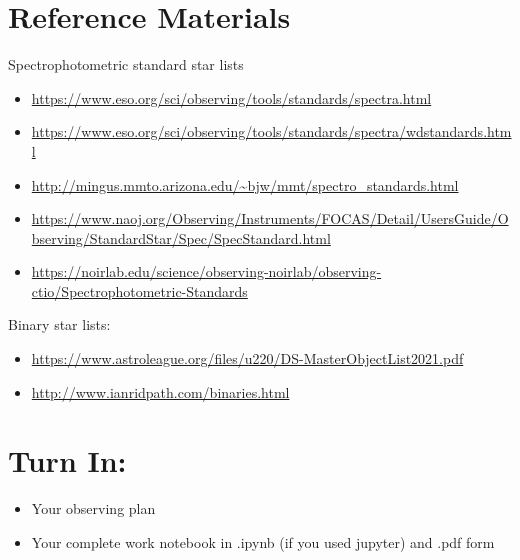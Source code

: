 \documentclass[11pt]{article}
\begin{document}
 

\section{Reference Materials}
Spectrophotometric standard star lists

\begin{itemize}
    \item \url{https://www.eso.org/sci/observing/tools/standards/spectra.html}
    \item \url{https://www.eso.org/sci/observing/tools/standards/spectra/wdstandards.html}
    \item \url{http://mingus.mmto.arizona.edu/~bjw/mmt/spectro_standards.html}
    \item \url{https://www.naoj.org/Observing/Instruments/FOCAS/Detail/UsersGuide/Observing/StandardStar/Spec/SpecStandard.html}
    \item \url{https://noirlab.edu/science/observing-noirlab/observing-ctio/Spectrophotometric-Standards}
\end{itemize}
 

Binary star lists:

\begin{itemize}
    \item \url{https://www.astroleague.org/files/u220/DS-MasterObjectList2021.pdf}
    \item \url{http://www.ianridpath.com/binaries.html}
\end{itemize}

\section{Turn In:}
\begin{itemize}
    \item Your observing plan
    \item Your complete work notebook in .ipynb (if you used jupyter) and .pdf form 
\end{itemize}
\end{document}

